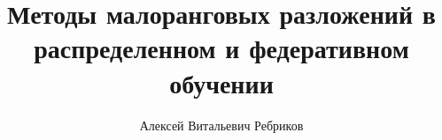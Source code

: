\documentclass{beamer}
\title[\hbox to 56mm{Малоранговые разложения в распределенном обучении}]{Методы малоранговых разложений в распределенном и федеративном обучении}
\author[А.\,В. Ребриков]{Алексей Витальевич Ребриков}
\institute{Московский физико-технический институт}
\date{\footnotesize
\par\smallskip\emph{Курс:} Автоматизация научных исследований\par (практика, В.\,В.~Стрижов)/Группа 105
\par\smallskip\emph{Эксперт:} А.\,Н.~Безносиков
\par\smallskip\emph{Консультант:} А.\,В.~Зыль
\par\bigskip\small 2024}
\begin{document}
\begin{frame}
\thispagestyle{empty}
\maketitle
\end{frame}
\end{document}

